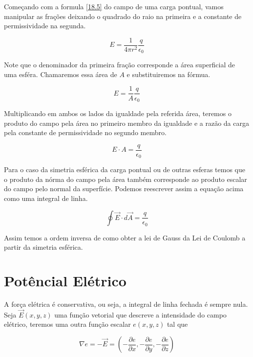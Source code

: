 Começando com a formula \eqref{18.5} do campo de uma carga pontual, vamos manipular as frações deixando o quadrado do raio na primeira e a constante de permissividade na segunda.

\begin{equation}\label{18.12}
    E=\dfrac{1}{4\pi r^2}\dfrac{q}{\epsilon_0}
\end{equation}

Note que o denominador da primeira fração corresponde a área superficial de uma esféra. Chamaremos essa área de $A$ e substituiremos na fórmua.

\begin{equation}\label{18.13}
    E=\dfrac{1}{A}\dfrac{q}{\epsilon_0}
\end{equation}

Multiplicando em ambos os lados da igualdade pela referida área, teremos o produto do campo pela área no primeiro membro da igualdade e a razão da carga pela constante de permissividade no segundo membro.

\begin{equation}\label{18.14}
    E \cdot A=\dfrac{q}{\epsilon_0}
\end{equation}

Para o caso da simetria esférica da carga pontual ou de outras esferas temos que o produto da nórma do campo pela área também corresponde ao produto escalar do campo pelo normal da superfície. Podemos reescrever assim a equação acima como uma integral de linha.

\begin{equation}\label{18.15}
   \oint { \vec { E } \cdot d\vec { A } } =\dfrac{q}{\epsilon_0}
\end{equation}

Assim temos a ordem inversa de como obter a lei de Gauss da Lei de Coulomb a partir da simetria esférica.

\section{Potêncial Elétrico}

A força elétrica é conservativa, ou seja, a integral de linha fechada é sempre nula. Seja $\vec{E}(x,y,z)$ uma função vetorial que descreve a intensidade do campo elétrico, teremos uma outra função escalar $e(x,y,z)$ tal que

\begin{equation}\label{18.16}
    \nabla e=-\vec{E}=\left( -\dfrac{\partial e}{\partial x}, -\dfrac{\partial e }{\partial y}, -\dfrac{\partial e}{\partial z} \right)
\end{equation}

